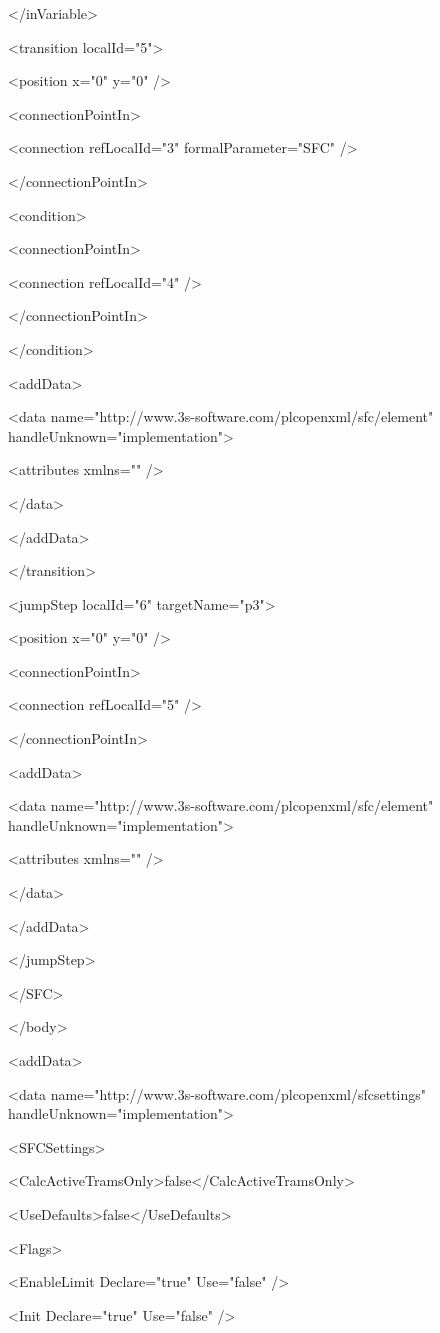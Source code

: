 { </inVariable>

 <transition localId="5">

  <position x="0" y="0" />

  <connectionPointIn>

   <connection refLocalId="3" formalParameter="SFC" />

  </connectionPointIn>

  <condition>

   <connectionPointIn>

    <connection refLocalId="4" />

   </connectionPointIn>

  </condition>

  <addData>

   <data name="http://www.3s-software.com/plcopenxml/sfc/element" handleUnknown="implementation">

    <attributes xmlns="" />

   </data>

  </addData>

 </transition>

 <jumpStep localId="6" targetName="p3">

  <position x="0" y="0" />

  <connectionPointIn>

   <connection refLocalId="5" />

  </connectionPointIn>

  <addData>

   <data name="http://www.3s-software.com/plcopenxml/sfc/element" handleUnknown="implementation">

    <attributes xmlns="" />

   </data>

  </addData>

 </jumpStep>

</SFC>

</body>

<addData>

<data name="http://www.3s-software.com/plcopenxml/sfcsettings" handleUnknown="implementation">

 <SFCSettings>

  <CalcActiveTramsOnly>false</CalcActiveTramsOnly>

  <UseDefaults>false</UseDefaults>

  <Flags>

   <EnableLimit Declare="true" Use="false" />

   <Init Declare="true" Use="false" />

}
